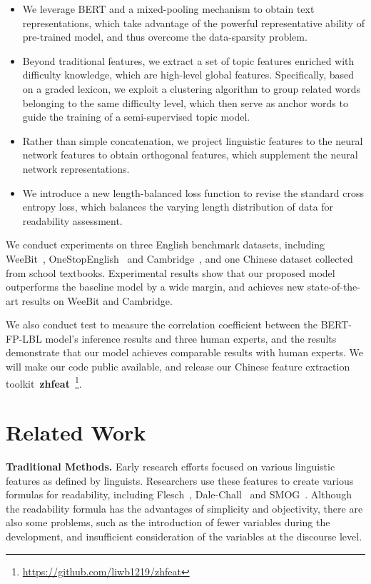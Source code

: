 \documentclass[11pt]{article}
\begin{document}
\begin{itemize}

\item{We leverage BERT and a mixed-pooling mechanism to obtain text representations, which take advantage of the powerful representative ability of pre-trained model, and thus overcome the data-sparsity problem.}

\item{Beyond traditional features, we extract a set of topic features enriched with difficulty knowledge, which are high-level global features.
Specifically, based on a graded lexicon, 
we exploit a clustering algorithm to group related words belonging to the same difficulty level, which then serve as anchor words to guide the training of a semi-supervised topic model.}

\item{Rather than simple concatenation, we project linguistic features to the neural network features to obtain orthogonal features, which supplement the neural network representations.}

\item{We introduce a new length-balanced loss function to revise the standard cross entropy loss, which balances the varying length distribution of data for readability assessment.}
\end{itemize}


We conduct experiments on three English benchmark datasets, including WeeBit~\cite{vajjala2012improving}, OneStopEnglish~\cite{vajjala2018onestopenglish} and Cambridge~\cite{xia2019text}, and one Chinese dataset collected from school textbooks. Experimental results show that our proposed model outperforms the baseline model by a wide margin, and achieves new state-of-the-art results on WeeBit and Cambridge. 

We also conduct test to measure the correlation coefficient between the BERT-FP-LBL model's inference results and three human experts, and the results demonstrate that our model achieves comparable results with human experts. 
We will make our code public available, and release our Chinese feature extraction toolkit~\textbf{zhfeat}~\footnote{\url{https://github.com/liwb1219/zhfeat}}.



\section{Related Work}

\textbf{Traditional Methods.}
Early research efforts focused on various linguistic features as defined by linguists. Researchers use these features to create various formulas for readability, including Flesch~\cite{flesch1948new}, Dale-Chall~\cite{dale1948formula} and SMOG~\cite{mc1969smog}. Although the readability formula has the advantages of simplicity and objectivity, there are also some problems, such as the introduction of fewer variables during the development, and insufficient consideration of the variables at the discourse level.
\end{document}

